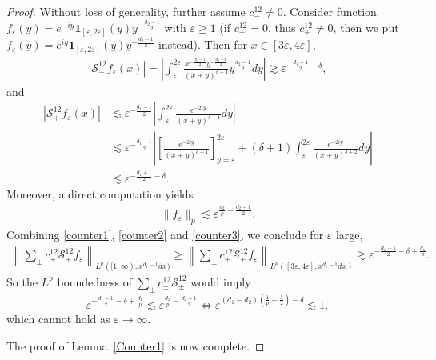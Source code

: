 \documentclass[12pt]{amsart}
\begin{document}
\begin{proof}
Without loss of generality, further assume $c_-^{12} \ne 0$. Consider function $f_\varepsilon(y) = e^{-iy} \mathbf{1}_{[\varepsilon,2\varepsilon]}(y) y^{-\frac{d_2-1}{2}}$ with $\varepsilon\ge 1$ (if $c_-^{12}=0$, thus $c_+^{12}\ne0$, then we put $f_\varepsilon(y) = e^{iy} \mathbf{1}_{[\varepsilon,2\varepsilon]}(y) y^{-\frac{d_2-1}{2}}$ instead). Then for $x\in [3\varepsilon, 4\varepsilon]$,
\begin{align}\label{counter1}
    |\mathcal{S}_-^{12}f_\varepsilon(x)| = \left| \int_\varepsilon^{2\varepsilon} \frac{x^{-\frac{d_1-1}{2}} y^{-\frac{d_2-1}{2}}}{(x+y)^{\delta+1}} y^{\frac{d_2-1}{2}} dy\right| \gtrsim  \varepsilon^{-\frac{d_1-1}{2}-\delta},
\end{align}
and 
\begin{align}\label{counter2}
    |\mathcal{S}_+^{12}f_\varepsilon(x)| &\lesssim \varepsilon^{-\frac{d_1-1}{2}} \left|  \int_\varepsilon^{2\varepsilon} \frac{e^{-2iy}}{(x+y)^{\delta+1}} dy  \right|\\ \nonumber
    &\lesssim \varepsilon^{-\frac{d_1-1}{2}} \left| \left[ \frac{e^{-2iy}}{(x+y)^{\delta+1}} \right]_{y=\varepsilon}^{2\varepsilon} + (\delta+1)  \int_\varepsilon^{2\varepsilon} \frac{e^{-2iy}}{(x+y)^{\delta+2}} dy  \right|\\ \nonumber
    &\lesssim \varepsilon^{-\frac{d_1+1}{2}-\delta}.
\end{align}
Moreover, a direct computation yields
\begin{align}\label{counter3}
    \|f_\varepsilon\|_p \lesssim \varepsilon^{\frac{d_2}{p} - \frac{d_2-1}{2}}.
\end{align}
Combining \eqref{counter1}, \eqref{counter2} and \eqref{counter3}, we conclude for $\varepsilon$ large,
\begin{align*}
    \left\| \sum_{\pm} c_\pm^{12} \mathcal{S}_{\pm}^{12}f_\varepsilon \right\|_{L^p([1,\infty), x^{d_1-1}dx)} \ge \left\| \sum_{\pm} c_\pm^{12} \mathcal{S}_{\pm}^{12}f_\varepsilon \right\|_{L^p([3\varepsilon, 4\varepsilon],x^{d_1-1}dx)} \gtrsim \varepsilon^{-\frac{d_1-1}{2}-\delta+\frac{d_1}{p}}.
\end{align*}
So the $L^p$ boundedness of $\sum_{\pm} c_\pm^{12} \mathcal{S}_{\pm}^{12} $ would imply
\begin{equation*}
    \varepsilon^{-\frac{d_1-1}{2}-\delta+\frac{d_1}{p}} \lesssim \varepsilon^{\frac{d_2}{p} - \frac{d_2-1}{2}} \iff \varepsilon^{(d_1-d_2)\left(\frac{1}{p}-\frac{1}{2}\right)-\delta}  \lesssim 1,
\end{equation*}
which cannot hold as $\varepsilon \to \infty$.

The proof of Lemma~\ref{Counter1} is now complete.






\end{proof}
\end{document}
